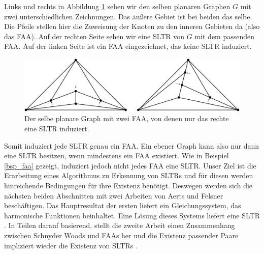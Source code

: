 \begin{example}\label{bsp_faa}
Links und rechts in Abbildung \ref{exp_faa} sehen wir den selben planaren Graphen $G$ mit zwei unterschiedlichen Zeichnungen. Das äußere Gebiet ist bei beiden das selbe. Die Pfeile stellen hier die Zuweisung der Knoten zu den inneren Gebieten da (also das FAA). Auf der rechten Seite sehen wir eine SLTR von $G$ mit dem passenden FAA. Auf der linken Seite ist ein FAA eingezeichnet, das keine SLTR induziert.

\begin{figure}[h]
	\centering
  \includegraphics[width=1\textwidth]{faa_def.png}
  \caption{Der selbe planare Graph mit zwei FAA, von denen nur das rechte eine SLTR induziert.}
  \label{exp_faa}
\end{figure}
\end{example}

Somit induziert jede SLTR genau ein FAA. Ein ebener Graph kann also nur dann eine SLTR besitzen, wenn mindestens ein FAA existiert. Wie in Beispiel \ref{bsp_faa} gezeigt, induziert jedoch nicht jedes FAA eine SLTR. Unser Ziel ist die Erarbeitung eines Algorithmus zu Erkennung von SLTRs und für diesen werden hinreichende Bedingungen für ihre Existenz benötigt. Deswegen werden sich die nächsten beiden Abschnitten mit zwei Arbeiten von Aerts und Felsner beschäftigen. Das Hauptresultat der ersten liefert ein Gleichungssystem, das harmonische Funktionen beinhaltet. Eine Lösung dieses Systems liefert eine SLTR \cite{af13}. In Teilen darauf basierend, stellt die zweite Arbeit einen Zusammenhang zwischen Schnyder Woods und FAAs her und die Existenz passender Paare impliziert wieder die Existenz von SLTRs \cite{af15}.



